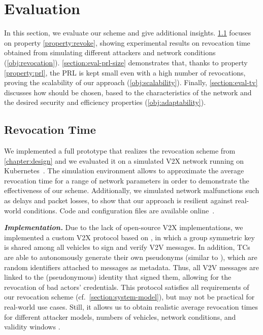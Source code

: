 \section{Evaluation}
\label{chapter:eval}

In this section, we evaluate our scheme and give additional insights.
\cref{section:eval-sim} focuses on property \ref{property:revoke}, showing
experimental results on revocation time obtained from simulating different
attackers and network conditions (\ref{obj:revocation}).
\cref{section:eval-prl-size} demonstrates that, thanks to property
\ref{property:prl}, the \ac{PRL} is kept small even with a high number of
revocations, proving the scalability of our approach (\ref{obj:scalability}).
Finally, \cref{section:eval-tv} discusses how \paramtt{} should be chosen, based
to the characteristics of the network and the desired security and efficiency
properties (\ref{obj:adaptability}).


\subsection{Revocation Time}
\label{section:eval-sim}

We implemented a full prototype that realizes the revocation scheme from
\cref{chapter:design} and we evaluated it on a simulated \ac{V2X} network
running on Kubernetes~\cite{kubernetes}. The simulation environment allows to
approximate the average revocation time for a range of network parameters in
order to demonstrate the effectiveness of our scheme. Additionally, we simulated
network malfunctions such as delays and packet losses, to show that our approach
is resilient against real-world conditions. Code and configuration files are
available online~\cite{supplMaterial}.

\noindent\textbf{\emph{Implementation.}}
%
Due to the lack of open-source \ac{V2X} implementations, we implemented a custom
\ac{V2X} protocol based on \cite{jangid2022towards}, in which a group symmetric
key is shared among all vehicles to sign and verify \ac{V2V} messages. In
addition, \acp{TC} are able to autonomously generate their own pseudonyms
(similar to \cite{whitefield2017privacy,desmoulins2019practical}), which are
random identifiers attached to messages as metadata. Thus, all \ac{V2V} messages
are linked to the (pseudonymous) identity that signed them, allowing for the
revocation of bad actors' credentials. This protocol satisfies all requirements
of our revocation scheme (cf.~\cref{section:system-model}), but may not be
practical for real-world use cases. Still, it allows us to obtain realistic
average revocation times for different attacker models, numbers of vehicles,
network conditions, and validity windows \paramtt{}.

